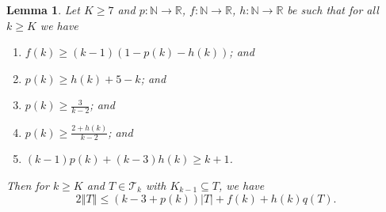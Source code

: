 \documentclass[12pt]{article}
\theoremstyle{plain}
\newtheorem{lem}[thm]{Lemma}
\theoremstyle{definition}
\theoremstyle{remark}
\newcommand{\fancy}[1]{\mathcal{#1}}
\newcommand{\IN}{\mathbb{N}}
\newcommand{\IR}{\mathbb{R}}
\newcommand{\T}{\fancy{T}}
\newcommand{\card}[1]{\left|#1\right|}
\newcommand{\size}[1]{\left\Vert#1\right\Vert}
\newcommand{\func}[3]{#1\colon #2 \rightarrow #3}
\begin{document}
\begin{lem}\label{BoundFamilyWithKKMinusOne}
	Let $K \ge 7$ and $\func{p}{\IN}{\IR}$, $\func{f}{\IN}{\IR}$, $\func{h}{\IN}{\IR}$ be such that for all $k \ge K$ we have
	\begin{enumerate}
		\item $f(k) \ge (k-1)(1- p(k) - h(k))$; and	
		\item $p(k) \ge h(k) + 5 - k$; and
		\item $p(k) \ge \frac{3}{k-2}$; and
		\item $p(k) \ge \frac{2+h(k)}{k-2}$; and
		\item $(k-1)p(k) + (k-3)h(k) \ge k+1$.
	\end{enumerate}
	Then for $k \ge K$ and $T \in \T_k$ with $K_{k-1} \subseteq T$, we have
	\[2\size{T} \le (k-3 + p(k))\card{T} + f(k) + h(k)q(T).\]
\end{lem}
\end{document}
